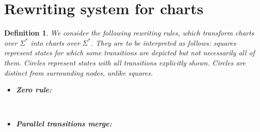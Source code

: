 \documentclass{article}
\newtheorem{definition}{Definition}[section]
\begin{document}
\section{Rewriting system for charts}



    \begin{definition} We consider the following rewriting rules,  which transform charts over $\Sigma^*$ into charts
         over
         $\Sigma^*$. They are to be interpreted as follows:
              squares represent states for which some transitions are depicted but not necessarily all of them.
               Circles represent states with all transitions explicitly shown.
                    Circles are distinct from surrounding nodes, unlike squares. 

         \begin{itemize}
          \item \textbf{Zero rule:}~\\
            \begin{center}
        ~\\
            \end{center}
            \item \textbf{Parallel transitions merge:}~\\
            \begin{center}
\end{center}
\end{itemize}
\end{definition}
\end{document}

